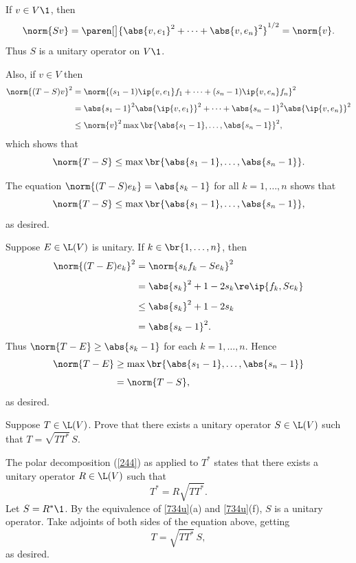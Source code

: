 \begin{Solution}
\begin{subtheorem}
\item
If $v \in V\1$, then
\[
\norm{Sv} = \paren[\big]{\abs{v, e_1}^2 + \cdots + \abs{v, e_n}^2 }^{1/2} = \norm{v}.
\]
Thus $S$ is a unitary operator on $V\1$.

Also, if $v \in V$ then
\begin{align*}
\norm{(T-S)v}^2 &= \norm{ (s_1 -1) \ip{v, e_1} f_1 + \cdots + (s_n -1) \ip{v, e_n} f_n }^2 \\[3bp]
&= \abs{s_1 -1}^2 \abs{\ip{v, e_1}}^2 + \cdots + \abs{s_n -1}^2 \abs{\ip{v, e_n}}^2 \\[3bp]
&\le \norm{v}^2 \max \br{ \abs{s_1 -1}, \ldots, \abs{s_n - 1} }^2,
\end{align*}
which shows that
\[
\norm{T-S} \le \max \br{ \abs{s_1 -1}, \ldots, \abs{s_n - 1} }.
\]

The equation $\norm{(T-S)e_k} = \abs{s_k - 1}$ for all $k = 1, \ldots, n$ shows that
\[
\norm{T-S} \le \max \br{ \abs{s_1 -1}, \ldots, \abs{s_n - 1} },
\]
as desired.

\item
Suppose $E \in \L(V)$ is unitary. If $k \in \br{1, \ldots, n}$, then
\begin{align*}
\norm{(T-E)e_k}^2 & = \norm{s_k f_k - Se_k}^2 \\[4bp]
&= \abs{s_k}^2 + 1 - 2 s_k \re \ip{f_k, Se_k} \\[4bp]
&\le \abs{s_k}^2 + 1 - 2 s_k \\[4bp]
&= \abs{s_k -1}^2.
\end{align*}
Thus $\norm{T-E} \ge \abs{s_k - 1}$ for each $k = 1, \ldots, n$. Hence
\begin{align*}
\norm{T-E} &\ge \max \br{ \abs{s_1 -1}, \ldots, \abs{s_n - 1} } \\[4bp]
&= \norm{T-S},
\end{align*}
as desired.
\end{subtheorem}
\end{Solution}

\exercise
Suppose $T \in \L(V)$. Prove that there exists a unitary operator $S \in \L(V)$ such that
$
T = \sqrt{TT^*}\, S$.

\begin{Solution}
The polar decomposition (\ref{244}) as applied to $T^*$ states that there exists a unitary operator $R \in \L(V)$ such that
\[
T^* = R \sqrt{TT^*}.
\]
Let $S = R^*\1$. By the equivalence of \ref{734u}(a) and \ref{734u}(f), $S$ is a unitary operator. Take adjoints of both sides of the equation above, getting
\[
T = \sqrt{TT^*}\, S,
\]
as desired.
\end{Solution}


